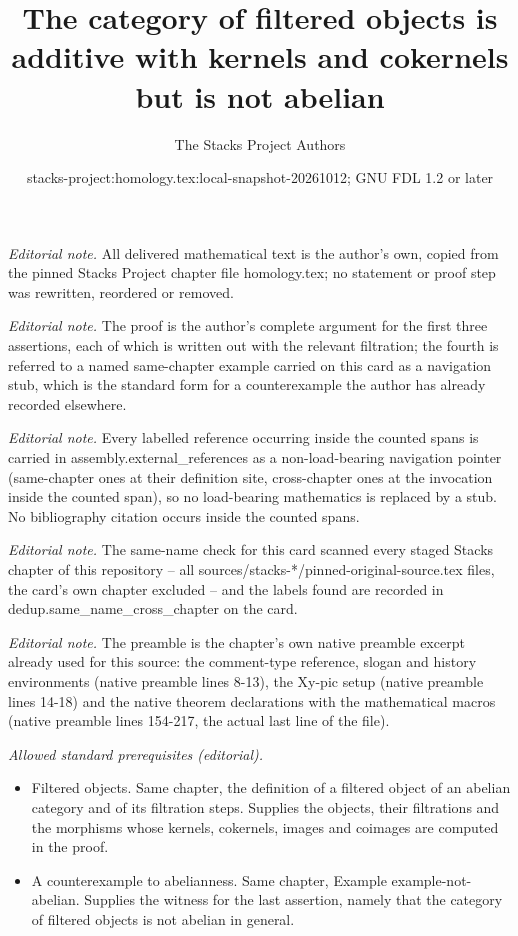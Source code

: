 \documentclass[10pt,a4paper]{amsart}
\title{The category of filtered objects is additive with kernels and cokernels but is not abelian}
\author{The Stacks Project Authors}
\date{stacks-project:homology.tex:local-snapshot-20261012; GNU FDL 1.2 or later}
\theoremstyle{plain}
\theoremstyle{definition}
\theoremstyle{remark}
\numberwithin{equation}{subsection}
\begin{document}
\maketitle
\noindent\textit{Editorial note.} All delivered mathematical text is the author's own, copied from the pinned Stacks Project chapter file homology.tex; no statement or proof step was rewritten, reordered or removed.\par\medskip
\noindent\textit{Editorial note.} The proof is the author's complete argument for the first three assertions, each of which is written out with the relevant filtration; the fourth is referred to a named same-chapter example carried on this card as a navigation stub, which is the standard form for a counterexample the author has already recorded elsewhere.\par\medskip
\noindent\textit{Editorial note.} Every labelled reference occurring inside the counted spans is carried in assembly.external\_references as a non-load-bearing navigation pointer (same-chapter ones at their definition site, cross-chapter ones at the invocation inside the counted span), so no load-bearing mathematics is replaced by a stub. No bibliography citation occurs inside the counted spans.\par\medskip
\noindent\textit{Editorial note.} The same-name check for this card scanned every staged Stacks chapter of this repository -- all sources/stacks-*/pinned-original-source.tex files, the card's own chapter excluded -- and the labels found are recorded in dedup.same\_name\_cross\_chapter on the card.\par\medskip
\noindent\textit{Editorial note.} The preamble is the chapter's own native preamble excerpt already used for this source: the comment-type reference, slogan and history environments (native preamble lines 8-13), the Xy-pic setup (native preamble lines 14-18) and the native theorem declarations with the mathematical macros (native preamble lines 154-217, the actual last line of the file).\par\medskip
\noindent\textit{Allowed standard prerequisites (editorial).}\begin{itemize}
\item Filtered objects. Same chapter, the definition of a filtered object of an abelian category and of its filtration steps. Supplies the objects, their filtrations and the morphisms whose kernels, cokernels, images and coimages are computed in the proof.
\item A counterexample to abelianness. Same chapter, Example example-not-abelian. Supplies the witness for the last assertion, namely that the category of filtered objects is not abelian in general.
\end{itemize}\medskip
\end{document}
